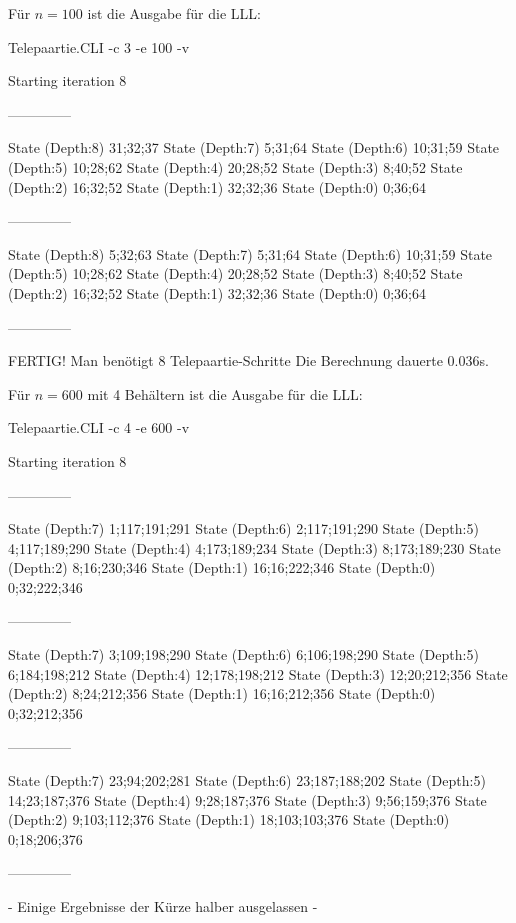 \documentclass[a4paper,10pt,ngerman]{scrartcl}
\begin{document}
Für \(n = 100\) ist die Ausgabe für die LLL:
\begin{lstcs}
Telepaartie.CLI -c 3 -e 100 -v

Starting iteration 8

--------------

State (Depth:8) {31;32;37}
State (Depth:7) {5;31;64}
State (Depth:6) {10;31;59}
State (Depth:5) {10;28;62}
State (Depth:4) {20;28;52}
State (Depth:3) {8;40;52}
State (Depth:2) {16;32;52}
State (Depth:1) {32;32;36}
State (Depth:0) {0;36;64}

--------------

State (Depth:8) {5;32;63}
State (Depth:7) {5;31;64}
State (Depth:6) {10;31;59}
State (Depth:5) {10;28;62}
State (Depth:4) {20;28;52}
State (Depth:3) {8;40;52}
State (Depth:2) {16;32;52}
State (Depth:1) {32;32;36}
State (Depth:0) {0;36;64}

--------------


FERTIG!
Man benötigt 8 Telepaartie-Schritte
Die Berechnung dauerte 0.036s.
\end{lstcs}

Für \(n = 600\) mit 4 Behältern ist die Ausgabe für die LLL:
\begin{lstcs}
Telepaartie.CLI -c 4 -e 600 -v

Starting iteration 8

--------------

State (Depth:7) {1;117;191;291}
State (Depth:6) {2;117;191;290}
State (Depth:5) {4;117;189;290}
State (Depth:4) {4;173;189;234}
State (Depth:3) {8;173;189;230}
State (Depth:2) {8;16;230;346}
State (Depth:1) {16;16;222;346}
State (Depth:0) {0;32;222;346}

--------------

State (Depth:7) {3;109;198;290}
State (Depth:6) {6;106;198;290}
State (Depth:5) {6;184;198;212}
State (Depth:4) {12;178;198;212}
State (Depth:3) {12;20;212;356}
State (Depth:2) {8;24;212;356}
State (Depth:1) {16;16;212;356}
State (Depth:0) {0;32;212;356}

--------------

State (Depth:7) {23;94;202;281}
State (Depth:6) {23;187;188;202}
State (Depth:5) {14;23;187;376}
State (Depth:4) {9;28;187;376}
State (Depth:3) {9;56;159;376}
State (Depth:2) {9;103;112;376}
State (Depth:1) {18;103;103;376}
State (Depth:0) {0;18;206;376}

--------------
\end{lstcs}

- Einige Ergebnisse der Kürze halber ausgelassen -
\end{document}
